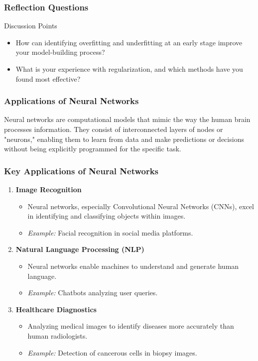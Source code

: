 \documentclass[aspectratio=169]{beamer}
\begin{document}
\begin{frame}[fragile]
    \frametitle{Reflection Questions}
    \begin{block}{Discussion Points}
        \begin{itemize}
            \item How can identifying overfitting and underfitting at an early stage improve your model-building process?
            \item What is your experience with regularization, and which methods have you found most effective?
        \end{itemize}
    \end{block}
\end{frame}

\begin{frame}[fragile]
    \frametitle{Applications of Neural Networks}

    Neural networks are computational models that mimic the way the human brain processes information. 
    They consist of interconnected layers of nodes or "neurons," enabling them to learn from data and make predictions 
    or decisions without being explicitly programmed for the specific task.
\end{frame}

\begin{frame}[fragile]
    \frametitle{Key Applications of Neural Networks}

    \begin{enumerate}
        \item \textbf{Image Recognition}
        \begin{itemize}
            \item Neural networks, especially Convolutional Neural Networks (CNNs), excel in identifying and classifying objects within images.
            \item \textit{Example:} Facial recognition in social media platforms.
        \end{itemize}

        \item \textbf{Natural Language Processing (NLP)}
        \begin{itemize}
            \item Neural networks enable machines to understand and generate human language.
            \item \textit{Example:} Chatbots analyzing user queries.
        \end{itemize}

        \item \textbf{Healthcare Diagnostics}
        \begin{itemize}
            \item Analyzing medical images to identify diseases more accurately than human radiologists.
            \item \textit{Example:} Detection of cancerous cells in biopsy images.
        \end{itemize}
    \end{enumerate}
\end{frame}
\end{document}
